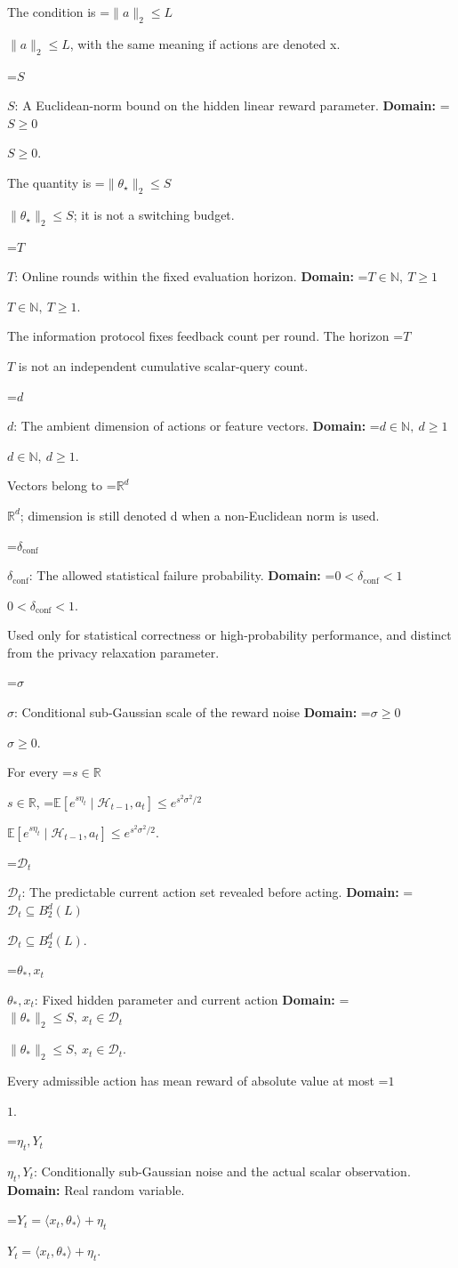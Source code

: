 \documentclass[10pt,a4paper]{article}
\newcommand{\AtlasMath}[1]{\par\begingroup\centering\setbox0=\hbox{$\displaystyle #1$}\ifdim\wd0>1.4\linewidth\typeout{ATLAS WIDE FORMULA: \the\wd0}\fi\ifdim\wd0>\linewidth\resizebox{\linewidth}{!}{\box0}\else\box0\fi\par\endgroup}
\newcommand{\AtlasInlineMath}[1]{\begingroup\setbox0=\hbox{$#1$}\ifdim\wd0>.4\linewidth\endgroup\AtlasMath{#1}\else\endgroup$#1$\fi}
\begin{document}
The condition is \AtlasInlineMath{\|a\|_2\le L}, with the same meaning if actions are denoted x.

\AtlasInlineMath{S}: A Euclidean-norm bound on the hidden linear reward parameter. \textbf{Domain:} \AtlasInlineMath{S\ge0}.

The quantity is \AtlasInlineMath{\|\theta_\star\|_2\le S}; it is not a switching budget.

\AtlasInlineMath{T}: Online rounds within the fixed evaluation horizon. \textbf{Domain:} \AtlasInlineMath{T\in\mathbb N,\ T\ge1}.

The information protocol fixes feedback count per round. The horizon \AtlasInlineMath{T} is not an independent cumulative scalar-query count.

\AtlasInlineMath{d}: The ambient dimension of actions or feature vectors. \textbf{Domain:} \AtlasInlineMath{d\in\mathbb N,\ d\ge1}.

Vectors belong to \AtlasInlineMath{\mathbb R^d}; dimension is still denoted d when a non-Euclidean norm is used.

\AtlasInlineMath{\delta_{\mathrm{conf}}}: The allowed statistical failure probability. \textbf{Domain:} \AtlasInlineMath{0<\delta_{\mathrm{conf}}<1}.

Used only for statistical correctness or high-probability performance, and distinct from the privacy relaxation parameter.

\AtlasInlineMath{\sigma}: Conditional sub-Gaussian scale of the reward noise \textbf{Domain:} \AtlasInlineMath{\sigma\ge0}.

For every \AtlasInlineMath{s\in\mathbb R}, \AtlasInlineMath{\mathbb E[e^{s\eta_t}\mid\mathcal H_{t-1},a_t]\le e^{s^2\sigma^2/2}}.

\AtlasInlineMath{\mathcal D_t}: The predictable current action set revealed before acting. \textbf{Domain:} \AtlasInlineMath{\mathcal D_t\subseteq B_2^d(L)}.

\AtlasInlineMath{\theta_*,x_t}: Fixed hidden parameter and current action \textbf{Domain:} \AtlasInlineMath{\|\theta_*\|_2\le S,\ x_t\in\mathcal D_t}.

Every admissible action has mean reward of absolute value at most \AtlasInlineMath{1}.

\AtlasInlineMath{\eta_t,Y_t}: Conditionally sub-Gaussian noise and the actual scalar observation. \textbf{Domain:} Real random variable.

\AtlasInlineMath{Y_t=\langle x_t,\theta_*\rangle+\eta_t}.
\end{document}
